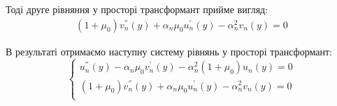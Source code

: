 \documentclass[a4paper,14pt]{extarticle}
\numberwithin{equation}{section}
\begin{document}
Тоді друге рівняння у просторі трансформант прийме вигляд:
\begin{align*}
    (1 + \mu_0) v_n^{''}(y) + \alpha_n \mu_0 u_n^{'}(y)  - \alpha_n^2 v_n(y) = 0
\end{align*}

В результаті отримаємо наступну систему рівнянь у просторі трансформант:
\begin{equation*}
    \begin{cases}
        u_n^{''}(y) - \alpha_n \mu_0 v_n^{'}(y) - \alpha_n^2 (1 + \mu_0) u_n(y) = 0 \\
        (1 + \mu_0) v_n^{''}(y) + \alpha_n \mu_0 u_n^{'}(y)  - \alpha_n^2 v_n(y) = 0 \\
    \end{cases}
\end{equation*}
\end{document}
